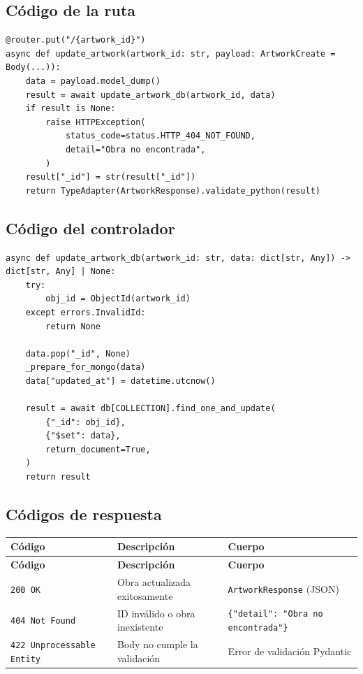 \documentclass[12pt,a4paper]{article}
\begin{document}
\subsection{Código de la ruta}

\begin{lstlisting}
@router.put("/{artwork_id}")
async def update_artwork(artwork_id: str, payload: ArtworkCreate = Body(...)):
    data = payload.model_dump()
    result = await update_artwork_db(artwork_id, data)
    if result is None:
        raise HTTPException(
            status_code=status.HTTP_404_NOT_FOUND,
            detail="Obra no encontrada",
        )
    result["_id"] = str(result["_id"])
    return TypeAdapter(ArtworkResponse).validate_python(result)
\end{lstlisting}

\subsection{Código del controlador}

\begin{lstlisting}
async def update_artwork_db(artwork_id: str, data: dict[str, Any]) -> dict[str, Any] | None:
    try:
        obj_id = ObjectId(artwork_id)
    except errors.InvalidId:
        return None

    data.pop("_id", None)
    _prepare_for_mongo(data)
    data["updated_at"] = datetime.utcnow()

    result = await db[COLLECTION].find_one_and_update(
        {"_id": obj_id},
        {"$set": data},
        return_document=True,
    )
    return result
\end{lstlisting}

\subsection{Códigos de respuesta}

\begin{longtable}{lll}
\toprule
\textbf{Código} & \textbf{Descripción} & \textbf{Cuerpo} \\
\midrule
\endfirsthead
\toprule
\textbf{Código} & \textbf{Descripción} & \textbf{Cuerpo} \\
\midrule
\endhead
\bottomrule
\endfoot
\texttt{200 OK} & Obra actualizada exitosamente & \texttt{ArtworkResponse} (JSON) \\
\texttt{404 Not Found} & ID inválido o obra inexistente & \texttt{\{"detail": "Obra no encontrada"\}} \\
\texttt{422 Unprocessable Entity} & Body no cumple la validación & Error de validación Pydantic \\
\bottomrule
\end{longtable}
\end{document}
